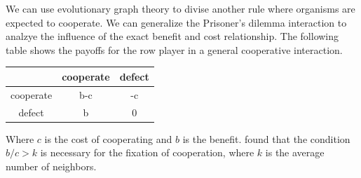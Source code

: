\documentclass[12pt, AofM.tex]{subfiles}
\begin{document}
We can use evolutionary graph theory to divise another rule where organisms are expected to cooperate. We can generalize the Prisoner's dilemma interaction to analzye the influence of the exact benefit and cost relationship. The following table shows the payoffs for the row player in a general cooperative interaction. 
\begin{center}
    \begin{tabular}{c | c c }
     & cooperate & defect \\
     \hline
     cooperate & b-c & -c \\
     defect & b & 0 \\
\end{tabular}
\end{center}
Where $c$ is the cost of cooperating and $b$ is the benefit. \cite{ohtsukiSimpleRuleEvolution2006} found that the condition $b/c > k$ is necessary for the fixation of cooperation, where $k$ is the average number of neighbors. 

 





\newpage
\end{document}
